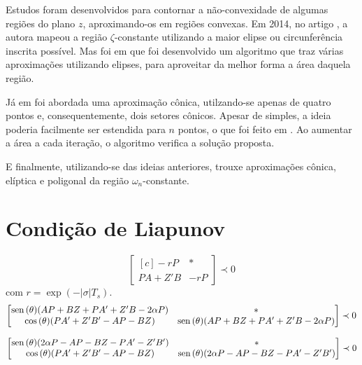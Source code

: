 Estudos foram desenvolvidos para contornar a não-convexidade de algumas regiões do plano $z$, aproximando-os em regiões convexas. Em 2014, no artigo \cite{ROSINOVA2014}, a autora mapeou a região $\zeta$-constante utilizando a maior elipse ou circunferência inscrita possível. Mas foi em \cite{ROSINOVA2019} que foi desenvolvido um algoritmo que traz várias aproximações utilizando elipses, para aproveitar da melhor forma a área daquela região.

Já em \cite{WISNIEWSKI2017} foi abordada uma aproximação cônica, utilzando-se apenas de quatro pontos e, consequentemente, dois setores cônicos. Apesar de simples, a ideia poderia facilmente ser estendida para $n$ pontos, o que foi feito em \cite{WISNIEWSKI2019}. Ao aumentar a área a cada iteração, o algoritmo verifica a solução proposta.

E finalmente, utilizando-se das ideias anteriores, \cite{CHIQUETO2021} trouxe aproximações cônica, elíptica e poligonal da região $\omega_n$-constante.

\section{Condição de Liapunov}

\begin{equation}
  \begin{bmatrix*}[c]
    -rP       & * \\
    PA + Z'B  & -rP
  \end{bmatrix*}
  \prec 0\label{eq:LMIEstabilidadeRelativa}
\end{equation}
com $r = \exp{\left(-|\sigma|T_s\right)}$.
\begin{equation}
  \begin{bmatrix*}[c]
    \sen{(\theta)(AP + BZ + PA' + Z'B -2\alpha P)} &  * \\
    \cos{(\theta)(PA' + Z'B'- AP - BZ)}      &  \sen{(\theta)(AP + BZ + PA' + Z'B -2\alpha P)}
  \end{bmatrix*}
  \prec 0\label{eq:LMIESetorConicoEsquerdo}
\end{equation}

\begin{equation}
  \begin{bmatrix*}[c]
    \sen{(\theta)(2\alpha P - AP - BZ - PA' - Z'B')} & * \\
    \cos{(\theta)(PA' + Z'B' - AP - BZ)}       & \sen{(\theta)(2\alpha P - AP - BZ - PA' - Z'B')}
  \end{bmatrix*}
  \prec 0\label{eq:LMIESetorConicoDireito}
\end{equation}

